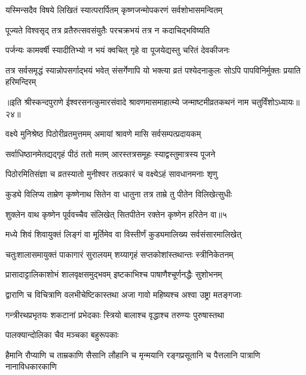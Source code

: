 \twolineshloka
{यस्मिन्सदैव विषये लिखितं स्यात्परार्पितम्}
{कृष्णजन्मोपकरणं सर्वशोभासमन्वितम्} %

\twolineshloka
{पूज्यते विश्वसृद् तत्र व्रतैरुत्सवसंयुतैः}
{परचक्रभयं तत्र न कदाचिद्भविष्यति} %

\twolineshloka
{पर्जन्यः कामवर्षी स्यादीतिभ्यो न भयं क्वचित्}
{गृहे वा पूजयेद्यस्तु चरितं देवकीजनः} %


\threelineshloka
{तत्र सर्वसमृद्धं स्यान्नोपसर्गाद्भयं भवेत्}
{संसर्गेणापि यो भक्त्या व्रतं पश्येदनाकुलः}
{सोऽपि पापविनिर्मुक्तः प्रयाति हरिमन्दिरम्} %


{॥इति श्रीस्कन्दपुराणे ईश्वरसनत्कुमारसंवादे श्रावणमासमाहात्म्ये जन्माष्टमीव्रतकथनं नाम चतुर्विंशोऽध्यायः॥२४॥}





\twolineshloka
{वक्ष्ये मुनिश्रेष्ठ पिठोरीव्रतमुत्तमम्}
{अमायां श्रावणे मासि सर्वसम्पत्प्रदायकम्} %

\twolineshloka
{सर्वाधिष्ठानमेतद्यद्गृहं पीठं ततो मतम्}
{आरस्तत्रसमूहः स्याद्वस्तुमात्रस्य पूजने} %

\twolineshloka
{पिठोरमितिसंज्ञा च व्रतस्यातो मुनीश्वर}
{तत्प्रकारं च वक्ष्येऽहं सावधानमनाः शृणु} %

\twolineshloka
{कुड्ये विलिप्य ताम्रेण कृष्णेनाथ सितेन वा}
{धातुना तत्र ताम्रे तु पीतेन विलिखेत्सुधीः} %

\twolineshloka
{शुक्लेन वाथ कृष्णेन पूर्ववच्चैव संलिखेत्}
{सितपीतेन रक्तेन कृष्णेन हरितेन वा॥५} %

\twolineshloka
{मध्ये शिवं शिवायुक्तं लिङ्गं वा मूर्तिमेव वा}
{विस्तीर्णं कुड्यमालिख्य सर्वसंसारमालिखेत्} %

\twolineshloka
{चतुःशालासमायुक्तं पाकागारं सुरालयम्}
{शय्यागृहं सप्तकोशांस्तथान्तः स्त्रीनिकेतनम्} %

\twolineshloka
{प्रासादाट्टालिकाशोभं शालवृक्षसमुद्भवम्}
{इष्टकाभिश्च पाषाणैश्चूर्णनद्धैः सुशोभनम्} %

\twolineshloka
{द्वाराणि च विचित्राणि वलभीचेष्टिकास्तथा}
{अजा गावो महिष्यश्च अश्वा उष्ट्रा मतङ्गजाः} %

\twolineshloka
{गन्त्रीरथप्रभृतयः शकटानां प्रभेदकाः}
{स्त्रियो बालाश्च वृद्धाश्च तरुण्यः पुरुषास्तथा} %

\onelineshloka
{पालक्यान्दोलिका चैव मञ्चका बहुरूपकाः} %

\twolineshloka
{हैमानि रौप्याणि च ताम्रकाणि सैसानि लौहानि च मृन्मयानि}
{रङ्गप्रसूतानि च पैत्तलानि पात्राणि नानाविधकारकाणि} %

